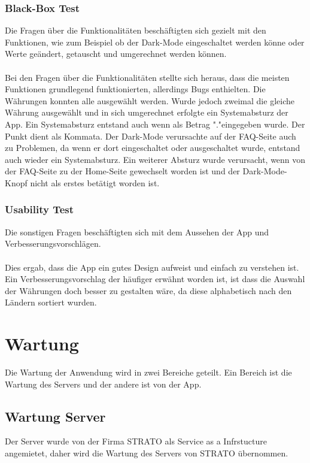 \documentclass[conference]{IEEEtran}
\begin{document}
\subsubsection{Black-Box Test}
Die Fragen über die Funktionalitäten beschäftigten sich gezielt mit den Funktionen, wie zum Beispiel ob der Dark-Mode eingeschaltet werden könne oder Werte geändert, getauscht und umgerechnet werden können. \\\\ Bei den Fragen über die Funktionalitäten stellte sich heraus, dass die meisten Funktionen grundlegend funktionierten, allerdings Bugs enthielten. Die Währungen konnten alle ausgewählt werden. Wurde jedoch zweimal die gleiche Währung ausgewählt und in sich umgerechnet erfolgte ein Systemabsturz der App. Ein Systemabsturz entstand auch wenn als Betrag "."\space eingegeben wurde. Der Punkt dient als Kommata. Der Dark-Mode verursachte auf der FAQ-Seite auch zu Problemen, da wenn er dort eingeschaltet oder ausgeschaltet wurde, entstand auch wieder ein Systemabsturz. Ein weiterer Absturz wurde verursacht, wenn von der FAQ-Seite zu der Home-Seite gewechselt worden ist und der Dark-Mode-Knopf nicht als erstes betätigt worden ist.

\subsubsection{Usability Test}
Die sonstigen Fragen beschäftigten sich mit dem Aussehen der App und Verbesserungsvorschlägen. \\\\ Dies ergab, dass die App ein gutes Design aufweist und einfach zu verstehen ist. Ein Verbesserungsvorschlag der häufiger erwähnt worden ist, ist dass die Auswahl der Währungen doch besser zu gestalten wäre, da diese alphabetisch nach den Ländern sortiert wurden.

\section{Wartung}
Die Wartung der Anwendung wird in zwei Bereiche geteilt. Ein Bereich ist die Wartung des Servers und der andere ist von der App.

\subsection{Wartung Server}
Der Server wurde von der Firma STRATO als Service as a Infrstucture angemietet, daher wird die Wartung des Servers von STRATO übernommen.
\end{document}
